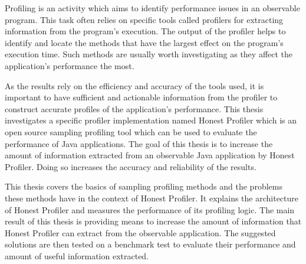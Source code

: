 \documentclass[..thesis.tex]{subfiles}
\begin{document}
Profiling is an activity which aims to identify performance issues in an observable program. This task often relies on specific tools called profilers for extracting information from the program's execution. The output of the profiler helps to identify and locate the methods that have the largest effect on the program's execution time. Such methods are usually worth investigating as they affect the application's performance the most. \cite{mytkowicz_evaluating_2010}

As the results rely on the efficiency and accuracy of the tools used, it is important to have sufficient and actionable information from the profiler to construct accurate profiles of the application's performance. This thesis investigates a specific profiler implementation named Honest Profiler which is an open source sampling profiling tool which can be used to evaluate the performance of Java applications. The goal of this thesis is to increase the amount of information extracted from an observable Java application by Honest Profiler. Doing so increases the accuracy and reliability of the results. 

This thesis covers the basics of sampling profiling methods and the problems these methods have in the context of Honest Profiler. It explains the architecture of Honest Profiler and measures the performance of its profiling logic. The main result of this thesis is providing means to increase the amount of information that Honest Profiler can extract from the observable application. The suggested solutions are then tested on a benchmark test to evaluate their performance and amount of useful information extracted.

\end{document}
